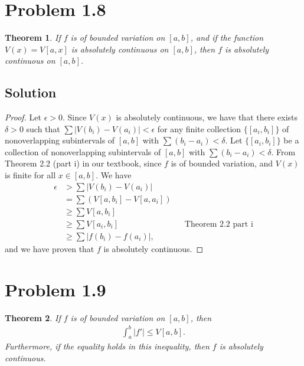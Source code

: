 \documentclass[10pt,a4paper]{article}
\theoremstyle{theorem}
\newtheorem{theorem}{Theorem}
\theoremstyle{definition}
\begin{document}
\section*{Problem 1.8}
\begin{theorem}
If $f$ is of bounded variation on $[a, b]$, and if the function $V(x) = V[a, x]$ is absolutely continuous on $[a, b]$, then $f$ is absolutely continuous on $[a, b]$.
\end{theorem}

\subsection*{Solution}
\begin{proof}
Let $\epsilon > 0$. Since $V(x)$ is absolutely continuous, we have that there exists $\delta > 0$ such that $\sum |V(b_i) - V(a_i)| < \epsilon$ for any finite collection $\{[a_i, b_i]\}$ of nonoverlapping subintervals of $[a, b]$ with $\sum (b_i - a_i) < \delta$. Let $\{[a_i, b_i]\}$ be a collection of nonoverlapping subintervals of $[a, b]$ with $\sum (b_i - a_i) < \delta$. From Theorem 2.2 (part i) in our textbook, since $f$ is of bounded variation, and $V(x)$ is finite for all $x \in [a, b]$. We have
\begin{align*}
\epsilon &> \sum |V(b_i) - V(a_i)|\\
&= \sum (V[a, b_i] - V[a, a_i])\\
&\geq \sum V[a, b_i]\\
&\geq \sum V[a_i, b_i] &&\text{Theorem 2.2 part i}\\
&\geq \sum |f(b_i) - f(a_i)|,
\end{align*}
and we have proven that $f$ is absolutely continuous.
\end{proof}

\section*{Problem 1.9}
\begin{theorem}
If $f$ is of bounded variation on $[a, b]$, then 
\begin{align*}
\int_a^b |f'| \leq V[a, b].
\end{align*}
Furthermore, if the equality holds in this inequality, then $f$ is absolutely continuous.
\end{theorem}
\end{document}
